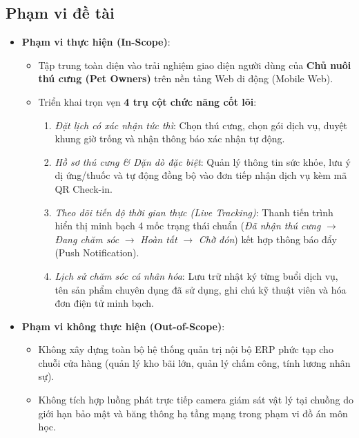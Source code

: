 \subsection{Phạm vi đề tài}
\begin{itemize}
    \item \textbf{Phạm vi thực hiện (In-Scope)}:
    \begin{itemize}
        \item Tập trung toàn diện vào trải nghiệm giao diện người dùng của \textbf{Chủ nuôi thú cưng (Pet Owners)} trên nền tảng Web di động (Mobile Web).
        \item Triển khai trọn vẹn \textbf{4 trụ cột chức năng cốt lõi}:
        \begin{enumerate}
            \item \textit{Đặt lịch có xác nhận tức thì}: Chọn thú cưng, chọn gói dịch vụ, duyệt khung giờ trống và nhận thông báo xác nhận tự động.
            \item \textit{Hồ sơ thú cưng \& Dặn dò đặc biệt}: Quản lý thông tin sức khỏe, lưu ý dị ứng/thuốc và tự động đồng bộ vào đơn tiếp nhận dịch vụ kèm mã QR Check-in.
            \item \textit{Theo dõi tiến độ thời gian thực (Live Tracking)}: Thanh tiến trình hiển thị minh bạch 4 mốc trạng thái chuẩn (\textit{Đã nhận thú cưng} $\rightarrow$ \textit{Đang chăm sóc} $\rightarrow$ \textit{Hoàn tất} $\rightarrow$ \textit{Chờ đón}) kết hợp thông báo đẩy (Push Notification).
            \item \textit{Lịch sử chăm sóc cá nhân hóa}: Lưu trữ nhật ký từng buổi dịch vụ, tên sản phẩm chuyên dụng đã sử dụng, ghi chú kỹ thuật viên và hóa đơn điện tử minh bạch.
        \end{enumerate}
    \end{itemize}
    \item \textbf{Phạm vi không thực hiện (Out-of-Scope)}:
    \begin{itemize}
        \item Không xây dựng toàn bộ hệ thống quản trị nội bộ ERP phức tạp cho chuỗi cửa hàng (quản lý kho bãi lớn, quản lý chấm công, tính lương nhân sự).
        \item Không tích hợp luồng phát trực tiếp camera giám sát vật lý tại chuồng do giới hạn bảo mật và băng thông hạ tầng mạng trong phạm vi đồ án môn học.
    \end{itemize}
\end{itemize}
